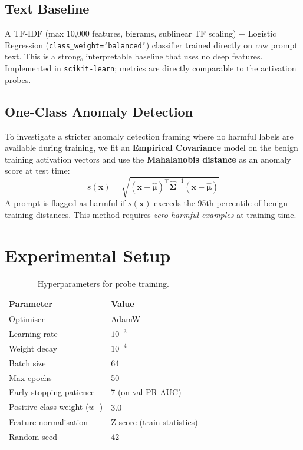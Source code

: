 \documentclass[11pt,a4paper]{article}
\begin{document}
\subsection{Text Baseline}

A TF-IDF (max 10{,}000 features, bigrams, sublinear TF scaling) + Logistic
Regression (\texttt{class\_weight=`balanced'}) classifier trained directly on
raw prompt text. This is a strong, interpretable baseline that uses no deep
features. Implemented in \texttt{scikit-learn}; metrics are directly comparable
to the activation probes.

\subsection{One-Class Anomaly Detection}
\label{sec:oneclass_method}

To investigate a stricter anomaly detection framing where no harmful labels
are available during training, we fit an \textbf{Empirical Covariance} model
on the benign training activation vectors and use the \textbf{Mahalanobis distance}
as an anomaly score at test time:
\begin{equation}
  s(\mathbf{x}) = \sqrt{(\mathbf{x} - \hat{\boldsymbol{\mu}})^\top \hat{\boldsymbol{\Sigma}}^{-1}
  (\mathbf{x} - \hat{\boldsymbol{\mu}})}
\end{equation}
A prompt is flagged as harmful if $s(\mathbf{x})$ exceeds the 95th percentile of
benign training distances. This method requires \emph{zero harmful examples} at
training time.

\section{Experimental Setup}
\label{sec:setup}

\begin{table}[H]
\centering
\caption{Hyperparameters for probe training.}
\label{tab:hyperparams}
\begin{tabular}{ll}
\toprule
Parameter & Value \\
\midrule
Optimiser & AdamW \\
Learning rate & $10^{-3}$ \\
Weight decay & $10^{-4}$ \\
Batch size & 64 \\
Max epochs & 50 \\
Early stopping patience & 7 (on val PR-AUC) \\
Positive class weight ($w_+$) & 3.0 \\
Feature normalisation & Z-score (train statistics) \\
Random seed & 42 \\
\bottomrule
\end{tabular}
\end{table}
\end{document}

